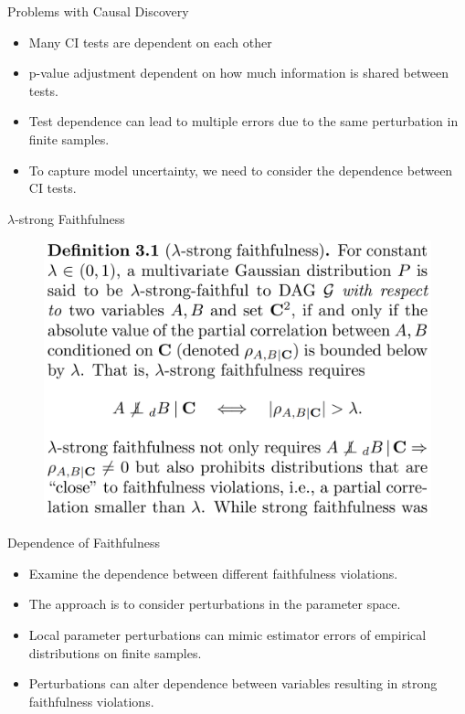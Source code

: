 \documentclass{beamer}
\begin{document}
\begin{frame}{Problems with Causal Discovery}
	\vspace{1em}
	\begin{itemize}
		\item Many CI tests are dependent on each other
		\item p-value adjustment dependent on how much information is shared between tests.
		\item Test dependence can lead to multiple errors due to the same perturbation in finite samples.
		\item To capture model uncertainty, we need to consider the dependence between CI tests.
	\end{itemize}
	\vspace{1em}

\end{frame}

\begin{frame}{$\lambda$-strong Faithfulness}
	\begin{figure}
		\includegraphics[scale=0.15]{imgs/def31.png}
	\end{figure}
\end{frame}

\begin{frame}{Dependence of Faithfulness}
	\begin{itemize}
		\item Examine the dependence between different faithfulness violations.
		\item The approach is to consider perturbations in the parameter space.
		\item Local parameter perturbations can mimic estimator errors of empirical distributions on finite samples.
		\item Perturbations can alter dependence between variables resulting in strong faithfulness violations.
	\end{itemize}
\end{frame}
\end{document}

